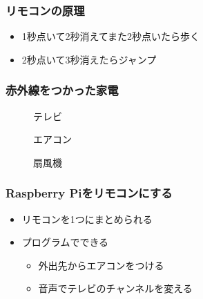\begin{frame}
    \frametitle{リモコンの原理} 
    \vspace{15pt}
    \begin{itemize}
        \item 1秒点いて2秒消えてまた2秒点いたら歩く
        \item 2秒点いて3秒消えたらジャンプ
    \end{itemize}
    \begin{center}
        
    \end{center}
\end{frame}

\begin{frame}
    \frametitle{赤外線をつかった家電}
    \begin{figure}[H]
    \begin{minipage}[t]{0.3\columnwidth}
        \centering
    
        \caption{テレビ}
    \end{minipage}
    \begin{minipage}[t]{0.3\columnwidth}
        \centering
        
        \caption{エアコン}
    \end{minipage}
    \begin{minipage}[t]{0.3\columnwidth}
        \centering
        
        \caption{扇風機}
    \end{minipage}
    \end{figure}
\end{frame}

\begin{frame}
    \frametitle{Raspberry Piをリモコンにする}
    \begin{itemize}
        \item リモコンを1つにまとめられる
        \vspace{10pt}
        \item プログラムでできる
        \begin{itemize}
            \item 外出先からエアコンをつける
            \item 音声でテレビのチャンネルを変える
        \end{itemize}
    \end{itemize}
\end{frame}

